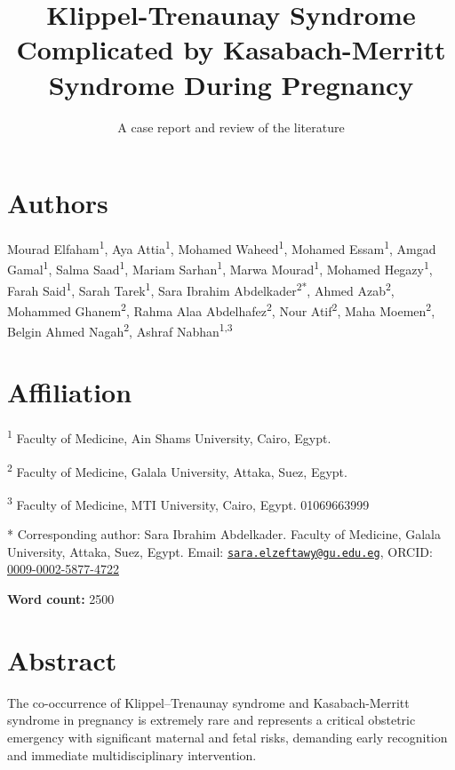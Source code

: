 \documentclass[
  letterpaper,
  DIV=11,
  numbers=noendperiod]{scrartcl}
\title{Klippel-Trenaunay Syndrome Complicated by Kasabach-Merritt
Syndrome During Pregnancy}
\subtitle{A case report and review of the literature}
\author{}
\date{}
\begin{document}
\maketitle


\section{Authors}\label{authors}

Mourad Elfaham\textsuperscript{1}, Aya Attia\textsuperscript{1}, Mohamed
Waheed\textsuperscript{1}, Mohamed Essam\textsuperscript{1}, Amgad
Gamal\textsuperscript{1}, Salma Saad\textsuperscript{1}, Mariam
Sarhan\textsuperscript{1}, Marwa Mourad\textsuperscript{1}, Mohamed
Hegazy\textsuperscript{1}, Farah Said\textsuperscript{1}, Sarah
Tarek\textsuperscript{1}, Sara Ibrahim Abdelkader\textsuperscript{2*},
Ahmed Azab\textsuperscript{2}, Mohammed Ghanem\textsuperscript{2}, Rahma
Alaa Abdelhafez\textsuperscript{2}, Nour Atif\textsuperscript{2}, Maha
Moemen\textsuperscript{2}, Belgin Ahmed Nagah\textsuperscript{2}, Ashraf
Nabhan\textsuperscript{1,3}

\section{Affiliation}\label{affiliation}

\textsuperscript{1} Faculty of Medicine, Ain Shams University, Cairo,
Egypt.

\textsuperscript{2} Faculty of Medicine, Galala University, Attaka,
Suez, Egypt.

\textsuperscript{3} Faculty of Medicine, MTI University, Cairo, Egypt.
01069663999

* Corresponding author: Sara Ibrahim Abdelkader. Faculty of Medicine,
Galala University, Attaka, Suez, Egypt. Email:
\href{mailto:sara.elzeftawy@gu.edu.eg}{\nolinkurl{sara.elzeftawy@gu.edu.eg}},
ORCID: \href{https://orcid.org/0009-0002-5877-4722}{0009-0002-5877-4722}

\textbf{Word count:} 2500

\section{Abstract}\label{abstract}

The co-occurrence of Klippel--Trenaunay syndrome and Kasabach-Merritt
syndrome in pregnancy is extremely rare and represents a critical
obstetric emergency with significant maternal and fetal risks, demanding
early recognition and immediate multidisciplinary intervention.
\end{document}
